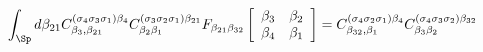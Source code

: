 \begin{equation}
\int_{\Sp}d\beta_{21}C_{\beta_{3},\beta_{21}}^{(\sigma_{4}\sigma_{3}\sigma_{1})\beta_{4}}
C_{\beta_{2}\beta_{1}}^{(\sigma_{3}\sigma_{2}\sigma_{1})\beta_{21}}%
F_{\beta_{21}\beta_{32}}\left[
\begin{array}
[c]{cc}%
\beta_{3} & \beta_{2}\\
\beta_{4} & \beta_{1}%
\end{array}
\right]
 =%
C_{\beta_{32},\beta_{1}}^{(\sigma_{4}\sigma_{2}\sigma_{1})\beta_{4}}
C_{\beta_{3}\beta_{2}}^{(\sigma_{4}\sigma_{3}\sigma_{2})\beta_{32}}
\label{pentagone boundary}
\end{equation}

